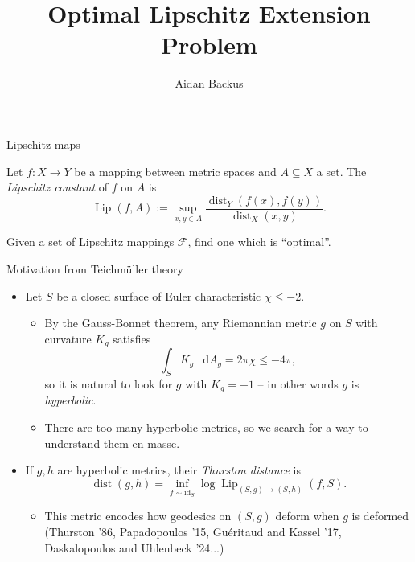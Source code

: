 \documentclass[10pt]{beamer}
\title{Optimal Lipschitz Extension Problem}
\author{Aidan Backus}
\newcommand*\dif{\mathop{}\!\mathrm{d}}
\DeclareMathOperator{\dist}{dist}
\DeclareMathOperator{\Lip}{Lip}
\newcommand{\id}{\mathrm{id}}
\begin{document}
\begin{frame}{Lipschitz maps}
\begin{definition}
Let $f: X \to Y$ be a mapping between metric spaces and $A \subseteq X$ a set.
The \emph{Lipschitz constant} of $f$ on $A$ is
$$\Lip(f, A) := \sup_{x, y \in A} \frac{\dist_Y(f(x), f(y))}{\dist_X(x, y)}.$$
\end{definition}
\pause 
\begin{problem}
Given a set of Lipschitz mappings $\mathscr F$, find one which is ``optimal''.
\end{problem}
\end{frame}

\begin{frame}{Motivation from Teichm\"uller theory}
\begin{itemize}
\item Let $S$ be a closed surface of Euler characteristic $\chi \leq -2$. \pause
\begin{itemize}
\item By the Gauss-Bonnet theorem, any Riemannian metric $g$ on $S$ with curvature $K_g$ satisfies 
$$\int_S K_g ~\dif A_g = 2\pi \chi \leq -4\pi,$$
so it is natural to look for $g$ with $K_g = -1$ -- in other words $g$ is \emph{hyperbolic}.
\item There are too many hyperbolic metrics, so we search for a way to understand them en masse. \pause
\end{itemize}
\item If $g, h$ are hyperbolic metrics, their \emph{Thurston distance} is
$$\dist(g, h) = \inf_{f \sim \id_S} \log \Lip_{(S, g) \to (S, h)}(f, S).$$
\begin{itemize}
\item This metric encodes how geodesics on $(S, g)$ deform when $g$ is deformed (Thurston '86, Papadopoulos '15, Gu\'eritaud and Kassel '17, Daskalopoulos and Uhlenbeck '24...) 
\end{itemize}
\end{itemize}
\end{frame}
\end{document}
